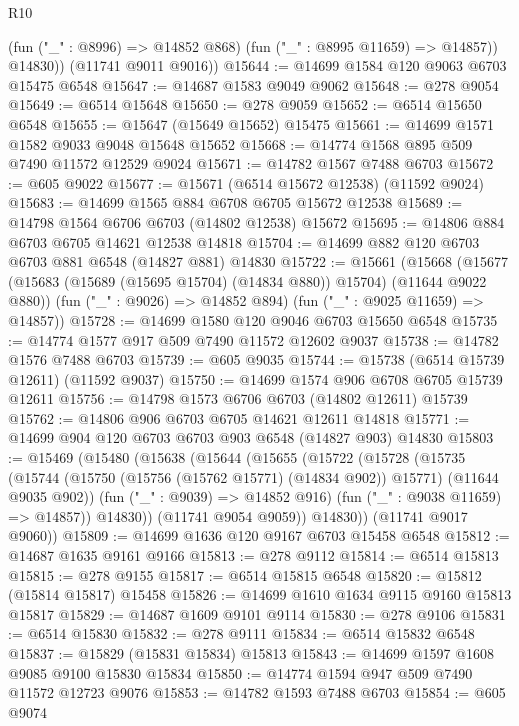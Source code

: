 \begin{lexlean}{R10}
\begin{coremodule}
{{{{{{{{{{{{{{{{{{{{{{{{{{{{{{{{{{{{{{{{{{{{{{{{{{{{{{{{{{{{{{{{{{{{{{{{{{{{{{{{{{{{            (fun ("_" : @8996) => @14852 @868)
            (fun ("_" : @8995 @11659) => @14857))
          @14830))
      (@11741 @9011 @9016))
@15644 := @14699 @1584 @120 @9063 @6703 @15475 @6548
@15647 := @14687 @1583 @9049 @9062
@15648 := @278 @9054
@15649 := @6514 @15648
@15650 := @278 @9059
@15652 := @6514 @15650 @6548
@15655 := @15647 (@15649 @15652) @15475
@15661 := @14699 @1571 @1582 @9033 @9048 @15648 @15652
@15668 := @14774 @1568 @895 @509 @7490 @11572 @12529 @9024
@15671 := @14782 @1567 @7488 @6703
@15672 := @605 @9022
@15677 := @15671 (@6514 @15672 @12538) (@11592 @9024)
@15683 := @14699 @1565 @884 @6708 @6705 @15672 @12538
@15689 := @14798 @1564 @6706 @6703 (@14802 @12538) @15672
@15695 := @14806 @884 @6703 @6705 @14621 @12538 @14818
@15704 := @14699 @882 @120 @6703 @6703 @881 @6548 (@14827 @881) @14830
@15722 := @15661
    (@15668
      (@15677 (@15683 (@15689 (@15695 @15704) (@14834 @880)) @15704) (@11644 @9022 @880))
      (fun ("_" : @9026) => @14852 @894)
      (fun ("_" : @9025 @11659) => @14857))
@15728 := @14699 @1580 @120 @9046 @6703 @15650 @6548
@15735 := @14774 @1577 @917 @509 @7490 @11572 @12602 @9037
@15738 := @14782 @1576 @7488 @6703
@15739 := @605 @9035
@15744 := @15738 (@6514 @15739 @12611) (@11592 @9037)
@15750 := @14699 @1574 @906 @6708 @6705 @15739 @12611
@15756 := @14798 @1573 @6706 @6703 (@14802 @12611) @15739
@15762 := @14806 @906 @6703 @6705 @14621 @12611 @14818
@15771 := @14699 @904 @120 @6703 @6703 @903 @6548 (@14827 @903) @14830
@15803 := @15469
    (@15480
      (@15638
        (@15644
          (@15655
            (@15722
              (@15728
                (@15735
                  (@15744
                    (@15750 (@15756 (@15762 @15771) (@14834 @902)) @15771)
                    (@11644 @9035 @902))
                  (fun ("_" : @9039) => @14852 @916)
                  (fun ("_" : @9038 @11659) => @14857))
                @14830))
            (@11741 @9054 @9059))
          @14830))
      (@11741 @9017 @9060))
@15809 := @14699 @1636 @120 @9167 @6703 @15458 @6548
@15812 := @14687 @1635 @9161 @9166
@15813 := @278 @9112
@15814 := @6514 @15813
@15815 := @278 @9155
@15817 := @6514 @15815 @6548
@15820 := @15812 (@15814 @15817) @15458
@15826 := @14699 @1610 @1634 @9115 @9160 @15813 @15817
@15829 := @14687 @1609 @9101 @9114
@15830 := @278 @9106
@15831 := @6514 @15830
@15832 := @278 @9111
@15834 := @6514 @15832 @6548
@15837 := @15829 (@15831 @15834) @15813
@15843 := @14699 @1597 @1608 @9085 @9100 @15830 @15834
@15850 := @14774 @1594 @947 @509 @7490 @11572 @12723 @9076
@15853 := @14782 @1593 @7488 @6703
@15854 := @605 @9074
}}}}}}}}}}}}}}}}}}}}}}}}}}}}}}}}}}}}}}}}}}}}}}}}}}}}}}}}}}}}}}}}}}}}}}}}}}}}}}}}}}}}
\end{coremodule}
\end{lexlean}
